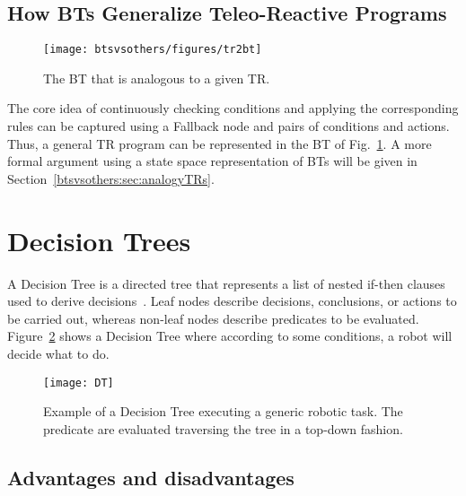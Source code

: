 \subsection{How BTs Generalize Teleo-Reactive Programs}
\label{sec:BT_generalize_TR}

\begin{figure}[htbp]
\begin{center}
\texttt{[image: btsvsothers/figures/tr2bt]}
\caption{The BT that is analogous to a given TR.}
\label{btsvsothers:tr2bt_v2}
\end{center}
\end{figure}


The core idea of continuously checking conditions and applying the corresponding rules can be captured using a Fallback node and pairs of conditions and actions. Thus, a general TR program can be represented in the BT of Fig.~\ref{btsvsothers:tr2bt_v2}.
A more formal argument using a state space representation of BTs will be given in Section~\ref{btsvsothers:sec:analogyTRs}.




\section{Decision Trees}
\label{sec:DT}
A Decision Tree is a directed tree that represents a list of nested if-then clauses used to derive decisions~\cite{sammut20027}. Leaf nodes describe decisions, conclusions, or actions to be carried out, whereas non-leaf nodes describe predicates to be evaluated. Figure~\ref{Arch.fig.dt} shows a Decision Tree where according to some conditions, a robot will decide what to do.




\begin{figure}[h]
\centering
\texttt{[image: DT]} 
   \caption{Example of a Decision Tree executing a generic robotic task. The predicate are evaluated traversing the tree in a top-down fashion.}
    \label{Arch.fig.dt}
\end{figure}


\subsection{Advantages and disadvantages}

